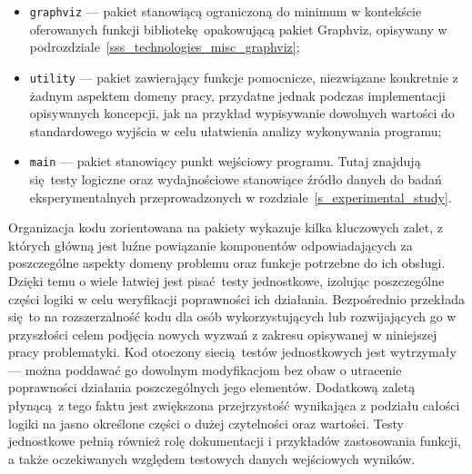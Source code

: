 {\begin{itemize}
    \item \texttt{graphviz} --- pakiet stanowiącą ograniczoną do minimum w kontekście oferowanych funkcji bibliotekę opakowującą pakiet Graphviz, opisywany w podrozdziale~\ref{sss_technologies_misc_graphviz};
    \item \texttt{utility} --- pakiet zawierający funkcje pomocnicze, niezwiązane konkretnie z żadnym aspektem domeny pracy, przydatne jednak podczas implementacji opisywanych koncepcji, jak na przykład wypisywanie dowolnych wartości do standardowego wyjścia w celu ułatwienia analizy wykonywania programu;
    \item \texttt{main} --- pakiet stanowiący punkt wejściowy programu. Tutaj znajdują się testy logiczne oraz wydajnościowe stanowiące źródło danych do badań eksperymentalnych przeprowadzonych w rozdziale~\ref{s_experimental_study}.
  \end{itemize}
}
\par{
  Organizacja kodu zorientowana na pakiety wykazuje kilka kluczowych zalet, z których główną jest luźne powiązanie komponentów odpowiadających za poszczególne aspekty domeny problemu oraz funkcje potrzebne do ich obsługi.
  Dzięki temu o wiele łatwiej jest pisać testy jednostkowe, izolując poszczególne części logiki w celu weryfikacji poprawności ich działania. 
  Bezpośrednio przekłada się to na rozszerzalność kodu dla osób wykorzystujących lub rozwijających go w przyszłości celem podjęcia nowych wyzwań z zakresu opisywanej w niniejszej pracy problematyki.
  Kod otoczony siecią testów jednostkowych jest wytrzymały --- można poddawać go dowolnym modyfikacjom bez obaw o utracenie poprawności działania poszczególnych jego elementów.
  Dodatkową zaletą płynącą z tego faktu jest zwiększona przejrzystość wynikająca z podziału całości logiki na jasno określone części o dużej czytelności oraz wartości.
  Testy jednostkowe pełnią również rolę dokumentacji i przykładów zastosowania funkcji, a także oczekiwanych względem testowych danych wejściowych wyników.
}